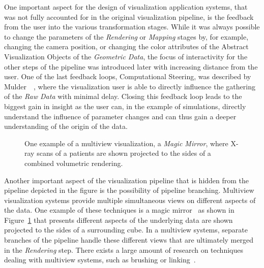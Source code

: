 One important aspect for the design of visualization application systems, that was not fully accounted for in the original visualization pipeline, is the feedback from the user into the various transformation stages.  While it was always possible to change the parameters of the \emph{Rendering} or \emph{Mapping} stages by, for example, changing the camera position, or changing the color attributes of the Abstract Visualization Objects of the \emph{Geometric Data}, the focus of interactivity for the other steps of the pipeline was introduced later with increasing distance from the user.  One of the last feedback loops, Computational Steering, was described by Mulder~\etal~\cite{mulder1999survey}, where the visualization user is able to directly influence the gathering of the \emph{Raw Data} with minimal delay.  Closing this feedback loop leads to the biggest gain in insight as the user can, in the example of simulations, directly understand the influence of parameter changes and can thus gain a deeper understanding of the origin of the data.

\begin{figure}
  \centering
  \caption{One example of a multiview visualization, a \emph{Magic Mirror}, where X-ray scans of a patients are shown projected to the sides of a combined volumetric rendering.}
  \label{fig:intro:mm}
\end{figure}

Another important aspect of the visualization pipeline that is hidden from the pipeline depicted in the figure is the possibility of pipeline branching.  Multiview visualization systems provide multiple simultaneous views on different aspects of the data.  One example of these techniques is a magic mirror~\cite{konig1999multiple} as shown in Figure~\ref{fig:intro:mm} that presents different aspects of the underlying data are shown projected to the sides of a surrounding cube.  In a multiview systems, separate branches of the pipeline handle these different views that are ultimately merged in the \emph{Rendering} step.  There exists a large amount of research on techniques dealing with multiview systems, such as brushing or linking~\cite{tory2003mental}.

